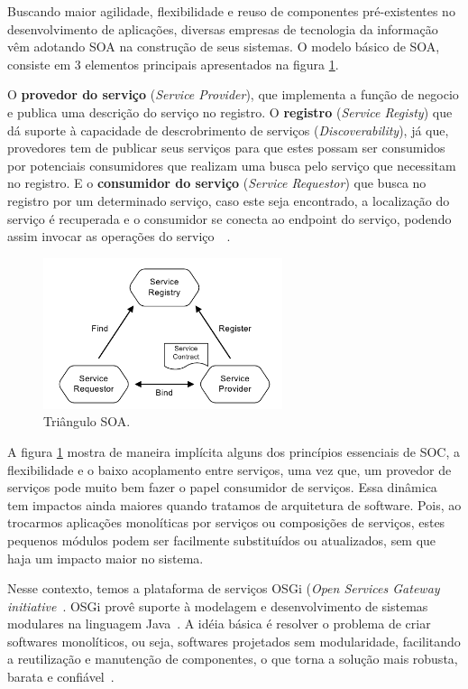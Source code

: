 Buscando maior agilidade, flexibilidade e reuso de componentes pré-existentes no desenvolvimento de aplicações, diversas empresas de tecnologia da informação vêm adotando SOA na construção de seus sistemas. O modelo básico de SOA, consiste em 3 elementos principais apresentados na figura \ref{fig:soatriangle}.

O \textbf{provedor do serviço} (\textit{Service Provider}), que implementa a função de negocio e publica uma descrição do serviço no registro. O \textbf{registro} (\textit{Service Registy}) que dá suporte à capacidade de descrobrimento de serviços (\textit{Discoverability}), já que, provedores tem de publicar seus serviços para que estes possam ser consumidos por potenciais consumidores que realizam uma busca pelo serviço que necessitam no registro. E o \textbf{consumidor do serviço} (\textit{Service Requestor}) que busca no registro por um determinado serviço, caso este seja encontrado, a localização do serviço é recuperada e o consumidor se conecta ao endpoint do serviço, podendo assim invocar as operações do serviço~\cite{michlmayr2007towards}~\cite{huhns2005service}.

\begin{figure}[htp]
\centering
\includegraphics[width=7cm]{chapters/intro/soa_triangle.png}
\caption[Triângulo SOA]{Triângulo SOA.}
\label{fig:soatriangle}
\end{figure}

A figura \ref{fig:soatriangle} mostra de maneira implícita alguns dos princípios essenciais de SOC, a flexibilidade e o baixo acoplamento entre serviços, uma vez que, um provedor de serviços pode muito bem fazer o papel consumidor de serviços. Essa dinâmica tem impactos ainda maiores quando tratamos de arquitetura de software. Pois, ao trocarmos aplicações monolíticas por serviços ou composições de serviços, estes pequenos módulos podem ser facilmente substituídos ou atualizados, sem que haja um impacto maior no sistema.

Nesse contexto, temos a plataforma de serviços OSGi (\textit{Open Services Gateway initiative}~\cite{alliance2007osgi}. OSGi provê suporte à modelagem e desenvolvimento de sistemas modulares na linguagem Java~\cite{hall2010osgi}. A idéia básica é resolver o problema de criar softwares monolíticos, ou seja, softwares projetados sem modularidade, facilitando a reutilização e manutenção de  componentes, o que torna a solução mais robusta, barata e confiável~\cite{davis2009open}.

